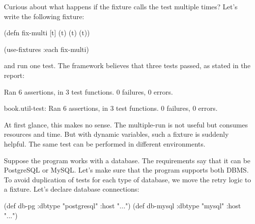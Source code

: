 
Curious about what happens if the fixture calls the test multiple times? Let's write the following fixture:

\begin{english}
  \begin{clojure}
(defn fix-multi [t]
  (t) (t) (t))

(use-fixtures :each fix-multi)
  \end{clojure}
\end{english}

\noindent
and run one test. The framework believes that three tests passed, as stated in the report:

\ifx\DEVICETYPE\MOBILE

\begin{english}
  \begin{text}
Ran 6 assertions, in 3 test functions.
0 failures, 0 errors.
  \end{text}
\end{english}

\else

\begin{english}
  \begin{text}
book.util-test: Ran 6 assertions, in 3 test functions.
0 failures, 0 errors.
  \end{text}
\end{english}

\fi

At first glance, this makes no sense. The multiple-run is not useful but consumes resources and time. But with dynamic variables, such a fixture is suddenly helpful. The same test can be performed in different environments.

Suppose the program works with a database. The requirements say that it can be PostgreSQL or MySQL. Let's make sure that the program supports both DBMS. To avoid duplication of tests for each type of database, we move the retry logic to a fixture. Let's declare database connections:

\ifx\DEVICETYPE\MOBILE

\begin{english}
  \begin{clojure}
(def db-pg
  {:dbtype "postgresql" :host "..."})
(def db-mysql
  {:dbtype "mysql"      :host "..."})
  \end{clojure}
\end{english}

\else

